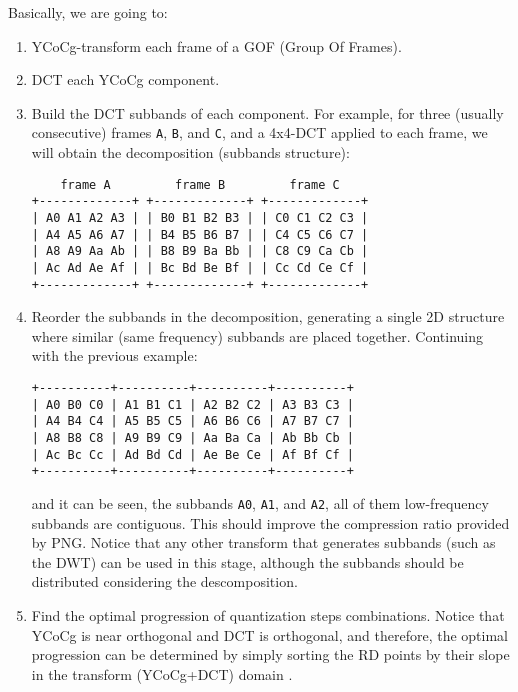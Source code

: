Basically, we are going to:
\begin{enumerate}
\item YCoCg-transform each frame of a GOF (Group Of Frames).
\item DCT each YCoCg component.
\item Build the DCT subbands of each component. For example, for three
  (usually consecutive) frames \verb|A|, \verb|B|, and \verb|C|, and a
  4x4-DCT applied to each frame, we will obtain the decomposition
  (subbands structure):
\begin{verbatim}
    frame A         frame B         frame C
+-------------+ +-------------+ +-------------+
| A0 A1 A2 A3 | | B0 B1 B2 B3 | | C0 C1 C2 C3 |
| A4 A5 A6 A7 | | B4 B5 B6 B7 | | C4 C5 C6 C7 |
| A8 A9 Aa Ab | | B8 B9 Ba Bb | | C8 C9 Ca Cb |
| Ac Ad Ae Af | | Bc Bd Be Bf | | Cc Cd Ce Cf |
+-------------+ +-------------+ +-------------+
\end{verbatim}

\item Reorder the subbands in the decomposition, generating a single
  2D structure where similar (same frequency) subbands are placed
  together. Continuing with the previous example:
\begin{verbatim}
+----------+----------+----------+----------+
| A0 B0 C0 | A1 B1 C1 | A2 B2 C2 | A3 B3 C3 |
| A4 B4 C4 | A5 B5 C5 | A6 B6 C6 | A7 B7 C7 |
| A8 B8 C8 | A9 B9 C9 | Aa Ba Ca | Ab Bb Cb |
| Ac Bc Cc | Ad Bd Cd | Ae Be Ce | Af Bf Cf |
+----------+----------+----------+----------+
\end{verbatim}
  and it can be seen, the subbands \verb|A0|, \verb|A1|, and
  \verb|A2|, all of them low-frequency subbands are contiguous. This
  should improve the compression ratio provided by PNG.  Notice that
  any other transform that generates subbands (such as the DWT) can be
  used in this stage, although the subbands should be distributed
  considering the descomposition.

\item Find the optimal progression of quantization steps
  combinations. Notice that YCoCg is near orthogonal and DCT is
  orthogonal, and therefore, the optimal progression can be determined
  by simply sorting the RD points by their slope in the transform
  (YCoCg+DCT) domain .


\end{enumerate}
